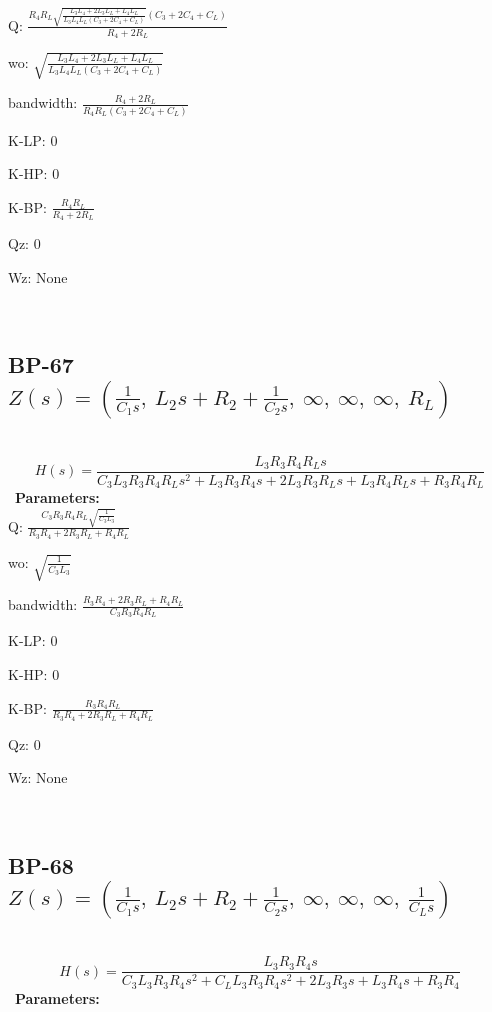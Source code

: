 \documentclass{article}
\begin{document}
Q: $\frac{R_{4} R_{L} \sqrt{\frac{L_{3} L_{4} + 2 L_{3} L_{L} + L_{4} L_{L}}{L_{3} L_{4} L_{L} \left(C_{3} + 2 C_{4} + C_{L}\right)}} \left(C_{3} + 2 C_{4} + C_{L}\right)}{R_{4} + 2 R_{L}}$\ 

wo: $\sqrt{\frac{L_{3} L_{4} + 2 L_{3} L_{L} + L_{4} L_{L}}{L_{3} L_{4} L_{L} \left(C_{3} + 2 C_{4} + C_{L}\right)}}$\ 

bandwidth: $\frac{R_{4} + 2 R_{L}}{R_{4} R_{L} \left(C_{3} + 2 C_{4} + C_{L}\right)}$\ 

K-LP: $0$\ 

K-HP: $0$\ 

K-BP: $\frac{R_{4} R_{L}}{R_{4} + 2 R_{L}}$\ 

Qz: $0$\ 

Wz: $\text{None}$\ 

\ 

\subsection{BP-67 $Z(s) = \left( \frac{1}{C_{1} s}, \  L_{2} s + R_{2} + \frac{1}{C_{2} s}, \  \infty, \  \infty, \  \infty, \  R_{L}\right)$ } \ 
\textbf{\[H(s) = \frac{L_{3} R_{3} R_{4} R_{L} s}{C_{3} L_{3} R_{3} R_{4} R_{L} s^{2} + L_{3} R_{3} R_{4} s + 2 L_{3} R_{3} R_{L} s + L_{3} R_{4} R_{L} s + R_{3} R_{4} R_{L}}\] } \ 
\textbf{Parameters:}\\ 

Q: $\frac{C_{3} R_{3} R_{4} R_{L} \sqrt{\frac{1}{C_{3} L_{3}}}}{R_{3} R_{4} + 2 R_{3} R_{L} + R_{4} R_{L}}$\ 

wo: $\sqrt{\frac{1}{C_{3} L_{3}}}$\ 

bandwidth: $\frac{R_{3} R_{4} + 2 R_{3} R_{L} + R_{4} R_{L}}{C_{3} R_{3} R_{4} R_{L}}$\ 

K-LP: $0$\ 

K-HP: $0$\ 

K-BP: $\frac{R_{3} R_{4} R_{L}}{R_{3} R_{4} + 2 R_{3} R_{L} + R_{4} R_{L}}$\ 

Qz: $0$\ 

Wz: $\text{None}$\ 

\ 

\subsection{BP-68 $Z(s) = \left( \frac{1}{C_{1} s}, \  L_{2} s + R_{2} + \frac{1}{C_{2} s}, \  \infty, \  \infty, \  \infty, \  \frac{1}{C_{L} s}\right)$ } \ 
\textbf{\[H(s) = \frac{L_{3} R_{3} R_{4} s}{C_{3} L_{3} R_{3} R_{4} s^{2} + C_{L} L_{3} R_{3} R_{4} s^{2} + 2 L_{3} R_{3} s + L_{3} R_{4} s + R_{3} R_{4}}\] } \ 
\textbf{Parameters:}\\ 
\end{document}
